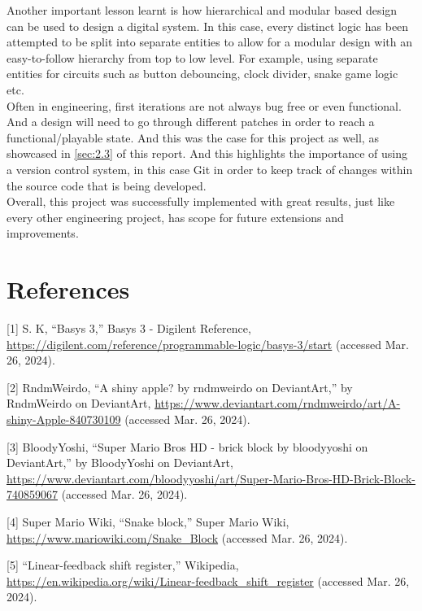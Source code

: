 \documentclass[aps, secnumarabic, balancelastpage, asmath, amssymb, nofootinbib, floatfix,]{revtex4-2}
\begin{document}
{Another important lesson learnt is how hierarchical and modular based design can be used to design a digital system. In this case, every distinct logic has been attempted to be split into separate entities to allow for a modular design with an easy-to-follow hierarchy from top to low level. For example, using separate entities for circuits such as button debouncing, clock divider, snake game logic etc.~\\


Often in engineering, first iterations are not always bug free or even functional. And a design will need to go through different patches in order to reach a functional/playable state. And this was the case for this project as well, as showcased in \ref{sec:2.3} of this report. And this highlights the importance of using a version control system, in this case Git in order to keep track of changes within the source code that is being developed.~\\

Overall, this project was successfully implemented with great results, just like every other engineering project, has scope for future extensions and improvements.


\clearpage


\section{\fontsize{11.3pt}{12pt}\selectfont \bf References}
\fontsize{11pt}{12pt}\selectfont \label{sec:5}

[1] S. K, ``Basys 3,'' Basys 3 - Digilent Reference, \url{https://digilent.com/reference/programmable-logic/basys-3/start} (accessed Mar. 26, 2024). 

[2] RndmWeirdo, “A shiny apple? by rndmweirdo on DeviantArt,” by RndmWeirdo on DeviantArt, \url{https://www.deviantart.com/rndmweirdo/art/A-shiny-Apple-840730109} (accessed Mar. 26, 2024). 

[3] BloodyYoshi, “Super Mario Bros HD - brick block by bloodyyoshi on DeviantArt,” by BloodyYoshi on DeviantArt, \url{https://www.deviantart.com/bloodyyoshi/art/Super-Mario-Bros-HD-Brick-Block-740859067} (accessed Mar. 26, 2024). 

[4] Super Mario Wiki, “Snake block,” Super Mario Wiki, \url{https://www.mariowiki.com/Snake\_Block} (accessed Mar. 26, 2024). 

[5] “Linear-feedback shift register,” Wikipedia, \url{https://en.wikipedia.org/wiki/Linear-feedback\_shift\_register} (accessed Mar. 26, 2024). 

}
\end{document}
